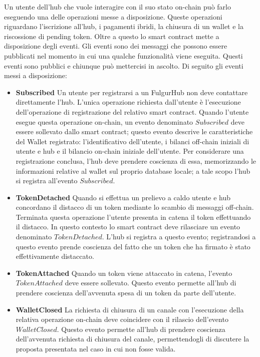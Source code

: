 \documentclass[12pt,italian,]{book}
\providecommand{\tightlist}{%
  \setlength{\itemsep}{0pt}\setlength{\parskip}{0pt}}
\begin{document}
Un utente dell'hub che vuole interagire con il suo stato on-chain può farlo eseguendo una delle operazioni messe a disposizione. Queste operazioni riguardano l'iscrizione all'hub, i pagamenti ibridi, la chiusura di un wallet e la riscossione di pending token. Oltre a questo lo smart contract mette a disposizione degli eventi. Gli eventi sono dei messaggi che possono essere pubblicati nel momento in cui una qualche funzionalità viene eseguita. Questi eventi sono pubblici e chiunque può mettercisi in ascolto. Di seguito gli eventi messi a disposizione:

\begin{itemize}
\tightlist
\item
  \textbf{\textbf{Subscribed}} Un utente per registrarsi a un FulgurHub non deve contattare direttamente l'hub. L'unica operazione richiesta dall'utente è l'esecuzione dell'operazione di registrazione del relativo smart contract. Quando l'utente esegue questa operazione on-chain, un evento denominato \(Subscribed\) deve essere sollevato dallo smart contract; questo evento descrive le caratteristiche del Wallet registrato: l'identificativo dell'utente, i bilanci off-chain iniziali di utente e hub e il bilancio on-chain iniziale dell'utente. Per considerare una registrazione conclusa, l'hub deve prendere coscienza di essa, memorizzando le informazioni relative al wallet sul proprio database locale; a tale scopo l'hub si registra all'evento \(Subscribed\).
\item
  \textbf{\textbf{TokenDetached}} Quando si effettua un prelievo a caldo utente e hub concordano il distacco di un token mediante lo scambio di messaggi off-chain. Terminata questa operazione l'utente presenta in catena il token effettuando il distacco. In questo contesto lo smart contract deve rilasciare un evento denominato \(TokenDetached\). L'hub si registra a questo evento; registrandosi a questo evento prende coscienza del fatto che un token che ha firmato è stato effettivamente distaccato.
\item
  \textbf{\textbf{TokenAttached}} Quando un token viene attaccato in catena, l'evento \(TokenAttached\) deve essere sollevato. Questo evento permette all'hub di prendere coscienza dell'avvenuta spesa di un token da parte dell'utente.
\item
  \textbf{\textbf{WalletClosed}} La richiesta di chiusura di un canale con l'esecuzione della relativa operazione on-chain deve coincidere con il rilascio dell'evento \(WalletClosed\). Questo evento permette all'hub di prendere coscienza dell'avvenuta richiesta di chiusura del canale, permettendogli di discutere la proposta presentata nel caso in cui non fosse valida.
\end{itemize}
\end{document}
